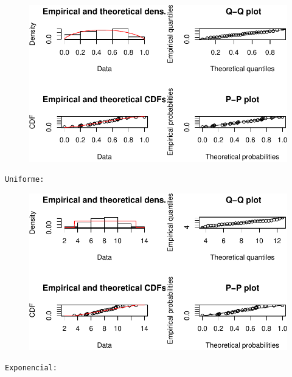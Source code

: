 \documentclass[
  letterpaper,
  DIV=11,
  numbers=noendperiod]{scrartcl}
\begin{document}
\begin{figure}[H]

{\centering \includegraphics{quiz5_files/figure-pdf/unnamed-chunk-37-6.pdf}

}

\end{figure}

\begin{verbatim}
Uniforme: 
\end{verbatim}

\begin{figure}[H]

{\centering \includegraphics{quiz5_files/figure-pdf/unnamed-chunk-37-7.pdf}

}

\end{figure}

\begin{verbatim}
Exponencial: 
\end{verbatim}
\end{document}
